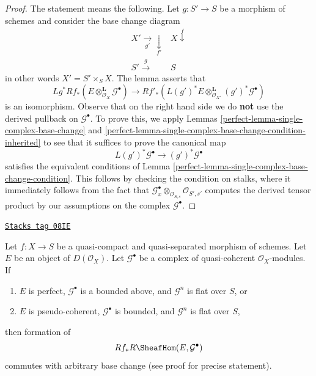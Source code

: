 \begin{proof}

The statement means the following. Let $g : S' \to S$ be a morphism of
schemes and consider the base change diagram
$$
\begin{array}{cc}X' \underset{g'}{\longrightarrow}\underset{f'}{\downarrow} & X \overset{f}{\downarrow} \\ S' \overset{g}{\longrightarrow} & S\end{array}
$$
in other words $X' = S' \times_S X$. The lemma asserts that
$$
Lg^*Rf_*(E \otimes^\mathbf{L}_{\mathcal{O}_X} \mathcal{G}^\bullet)
\longrightarrow
Rf'_*\left(
L(g')^*E \otimes^\mathbf{L}_{\mathcal{O}_{X'}} (g')^*\mathcal{G}^\bullet
\right)
$$
is an isomorphism. Observe that on the right hand side we do {\bf not}
use the derived pullback on $\mathcal{G}^\bullet$.
To prove this, we apply Lemmas \ref{perfect-lemma-single-complex-base-change} and
\ref{perfect-lemma-single-complex-base-change-condition-inherited} to see that it
suffices to prove the canonical map
$$
L(g')^*\mathcal{G}^\bullet \to (g')^*\mathcal{G}^\bullet
$$
satisfies the equivalent conditions of
Lemma \ref{perfect-lemma-single-complex-base-change-condition}.
This follows by checking the condition on stalks, where it
immediately follows from the fact that
$\mathcal{G}^\bullet_x \otimes_{\mathcal{O}_{S, s}} \mathcal{O}_{S', s'}$
computes the derived tensor product by our assumptions on the complex
$\mathcal{G}^\bullet$.
\end{proof}

\begin{lemma}
\label{perfect-lemma-base-change-RHom}
\href{https://stacks.math.columbia.edu/tag/08IE}{\texttt{Stacks tag 08IE}}

Let $f : X \to S$ be a quasi-compact and quasi-separated morphism of schemes.
Let $E$ be an object of $D(\mathcal{O}_X)$.
Let $\mathcal{G}^\bullet$ be a complex of
quasi-coherent $\mathcal{O}_X$-modules. If
\begin{enumerate}
\item $E$ is perfect, $\mathcal{G}^\bullet$ is a bounded above,
and $\mathcal{G}^n$ is flat over $S$, or
\item $E$ is pseudo-coherent, $\mathcal{G}^\bullet$ is bounded,
and $\mathcal{G}^n$ is flat over $S$,
\end{enumerate}
then formation of
$$
Rf_*R\SheafHom(E, \mathcal{G}^\bullet)
$$
commutes with arbitrary base change (see proof for precise statement).
\end{lemma}


